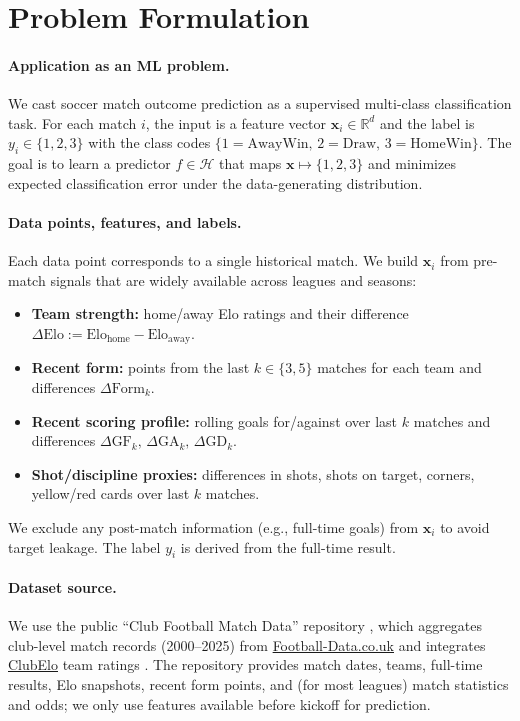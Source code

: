 \documentclass[a4paper,12pt,twoside,english]{all-in-one}
\author{Eppu Ruotsalainen}
\begin{document}
\setlength{\baselineskip}{.70cm}

\pagestyle{\defaultsettings}

\section{Problem Formulation}

\paragraph{Application as an ML problem.}
We cast soccer match outcome prediction as a supervised multi-class classification task. For each match \(i\), the input is a feature vector \(\mathbf{x}_i \in \mathbb{R}^d\) and the label is \(y_i \in \{1,2,3\}\) with the class codes \(\{1=\text{AwayWin},\,2=\text{Draw},\,3=\text{HomeWin}\}\). The goal is to learn a predictor \(f \in \mathcal{H}\) that maps \(\mathbf{x} \mapsto \{1,2,3\}\) and minimizes expected classification error under the data-generating distribution.

\paragraph{Data points, features, and labels.}
\label{features}
Each data point corresponds to a single historical match. We build \(\mathbf{x}_i\) from pre-match signals that are widely available across leagues and seasons:
\begin{itemize}
  \item \textbf{Team strength:} home/away Elo ratings and their difference \(\Delta\text{Elo} := \text{Elo}_{\text{home}} - \text{Elo}_{\text{away}}\).
  \item \textbf{Recent form:} points from the last \(k\in\{3,5\}\) matches for each team and differences \(\Delta\text{Form}_k\).
  \item \textbf{Recent scoring profile:} rolling goals for/against over last \(k\) matches and differences \(\Delta\text{GF}_k,\,\Delta\text{GA}_k,\,\Delta\text{GD}_k\).
  \item \textbf{Shot/discipline proxies:} differences in shots, shots on target, corners, yellow/red cards over last \(k\) matches.
\end{itemize}
We exclude any post-match information (e.g., full-time goals) from \(\mathbf{x}_i\) to avoid target leakage. The label \(y_i\) is derived from the full-time result.

\paragraph{Dataset source.}
We use the public \enquote{Club Football Match Data} repository \citep{xgabora_club_football_2000_2025}, which aggregates club-level match records (2000--2025) from \href{https://football-data.co.uk/}{Football-Data.co.uk} and integrates \href{https://clubelo.com/}{ClubElo} team ratings \cite{football_data_couk,clubelo_website}. The repository provides match dates, teams, full-time results, Elo snapshots, recent form points, and (for most leagues) match statistics and odds; we only use features available before kickoff for prediction.
\end{document}
